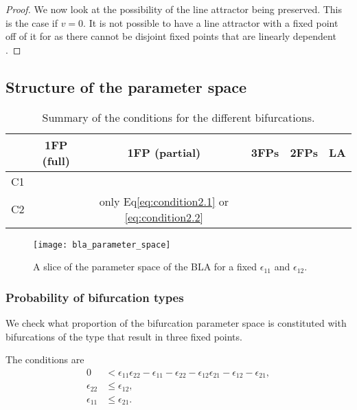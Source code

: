 \documentclass{article} %
\newcounter{ct}
\newcommand{\cmark}{\ding{51}}%
\newcommand{\xmark}{\ding{55}}%
\theoremstyle{definition}
\theoremstyle{remark}
\begin{document}
\begin{proof}
We now look at the possibility of the line attractor being preserved. 
This is the case if $v=0$.
It is not possible to have a line attractor with a fixed point off of it for as there cannot be disjoint fixed points that are linearly dependent \citep[Lemma 5.2]{morrison2016a}.
\end{proof}

\subsection{Structure of the parameter space}
\begin{table}[H]
\caption{Summary of the conditions for the different bifurcations.}\label{tab:bifs}
\centering
\bgroup
\def\arraystretch{1.52}
\begin{tabular}{|c||c|c|c|c|c|}
\hline
& 1FP (full) 		& 1FP (partial) & 3FPs & 2FPs & LA  \\\hline \hline
C1 & \cmark	 	& \xmark 	 & \cmark & \xmark & \xmark \\\hline 
C2 & \xmark 		& only Eq\ref{eq:condition2.1} or \ref{eq:condition2.2}  	 & \cmark & \cmark& \xmark \\\hline 
\end{tabular}
\egroup
\end{table}

\begin{figure}[H]
  \centering
  \texttt{[image: bla\_parameter\_space]}
  \caption{A slice of the parameter space of the BLA for a fixed $\epsilon_{11}$ and $\epsilon_{12}$. %
  }
  \label{fig:blaparameterspace}
\end{figure}


\subsubsection{Probability of bifurcation types}\label{sec:supp:probbla}
We check what proportion of the bifurcation parameter space is constituted with bifurcations of the type that result in three fixed points.

The conditions are 
\begin{align*}
0 &< \epsilon_{11}\epsilon_{22}-\epsilon_{11}-\epsilon_{22}-\epsilon_{12}\epsilon_{21}-\epsilon_{12}-\epsilon_{21},\\
\epsilon_{22} &\leq \epsilon_{12},\\
\epsilon_{11} &\leq \epsilon_{21}.
\end{align*}
\end{document}

